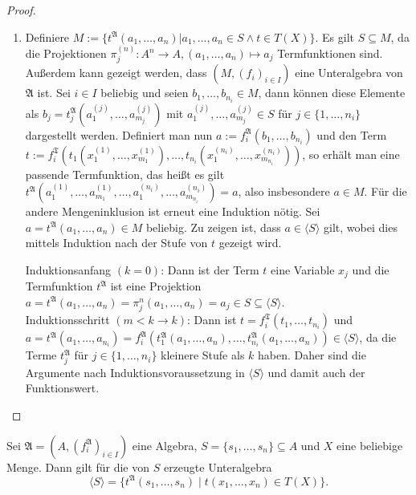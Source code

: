 \begin{proof}
\begin{enumerate}
        \item Definiere $M:=\{t^\mathfrak{A}(a_1,\ldots,a_n)\vert a_1,\ldots,a_n\in S\land t\in T(X)\}$.
        Es gilt $S\subseteq M$, da die Projektionen $\pi_j^{(n)}:A^n\to A, (a_1,\ldots,a_n)\mapsto a_j$ Termfunktionen sind.
        Außerdem kann gezeigt werden, dass $(M,(f_i)_{i\in I})$ eine Unteralgebra von $\mathfrak{A}$ ist. Sei $i\in I$ beliebig
        und seien $b_1,\ldots,b_{n_i}\in M$, dann können diese Elemente als $b_j=t_j^\mathfrak{A}(a_1^{(j)},\ldots,a_{m_j}^{(j)})$
        mit $a_1^{(j)},\ldots,a_{m_j}^{(j)}\in S$ für $j\in \{1,\ldots,n_i\}$ dargestellt werden. Definiert man nun $a:=f^\mathfrak{A}_i(b_1,\ldots,b_{n_i})$
        und den Term $t:=f_i^\mathfrak{T}(t_1(x_1^{(1)},\ldots,x_{m_1}^{(1)}),\ldots,t_{n_i}(x_1^{(n_i)},\ldots,x_{m_{n_i}}^{(n_i)}))$,
        so erhält man eine passende Termfunktion, das heißt es gilt $t^\mathfrak{A}(a_1^{(1)},\ldots,a_{m_1}^{(1)},\ldots,a_1^{(n_i)},\ldots,a_{m_{n_i}}^{(n_i)})=a$,
        also insbesondere $a\in M$. Für die andere Mengeninklusion ist erneut eine Induktion nötig.
        Sei $a=t^\mathfrak{A}(a_1,\ldots,a_n)\in M$ beliebig. Zu zeigen ist, dass $a\in \langle S\rangle$ gilt,
        wobei dies mittels Induktion nach der Stufe von $t$ gezeigt wird.

        Induktionsanfang $(k=0)$: Dann ist der Term $t$ eine Variable $x_j$ und die Termfunktion
        $t^\mathfrak{A}$ ist eine Projektion $a=t^\mathfrak{A}(a_1,\ldots,a_n)=\pi_j^n(a_1,\ldots,a_n)=a_j\in S\subseteq \langle S\rangle$.\\
        Induktionsschritt $(m<k\to k)$: Dann ist $t=f^\mathfrak{T}_i(t_1,\ldots,t_{n_i})$ und
        $a=t^\mathfrak{A}(a_1,\ldots,a_{n_i})=f^\mathfrak{A}_i(t^\mathfrak{A}_1(a_1,\ldots,a_n),\ldots,t^\mathfrak{A}_{n_i}(a_1,\ldots,a_n))\in\langle S\rangle$,
        da die Terme $t^\mathfrak{A}_j$ für $j\in\{1,\ldots,n_i\}$ kleinere Stufe als $k$ haben. Daher
        sind die Argumente nach Induktionsvoraussetzung in $\langle S\rangle$ und damit auch
        der Funktionswert.
    \end{enumerate}
\end{proof}

\begin{corollary}
    Sei $\mathfrak{A}=(A,(f^\mathfrak{A}_i)_{i\in I})$ eine Algebra, $S=\{s_1,\ldots,s_n\}\subseteq A$ und $X$ eine beliebige Menge.
    Dann gilt für die von $S$ erzeugte Unteralgebra
    $$ \langle S\rangle=\{t^\mathfrak{A}(s_1,\ldots,s_n)\mid t(x_1,\ldots,x_n)\in T(X)\}. $$
\end{corollary}


